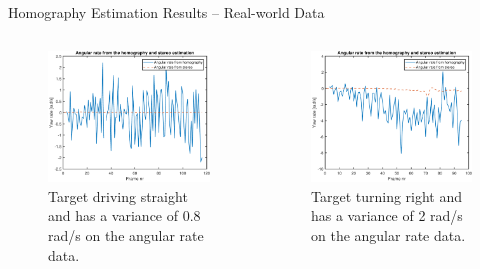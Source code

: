 \documentclass{beamer}
\begin{document}
\begin{frame}{Homography Estimation Results -- Real-world Data}
	\begin{columns}[T]
	\begin{figure}
		\includegraphics[width=\textwidth]{Hom/155532_AngVelComparison}
		\caption{Target driving straight and has a variance of 0.8 rad/s on the angular rate data.}
	\end{figure}
	\begin{figure}
		\includegraphics[width=\textwidth]{Hom/155733_AngVelComparison}
		\caption{Target turning right and has a variance of  2 rad/s on the angular rate data.}
	\end{figure}
	\end{columns}


\end{frame}
\end{document}
